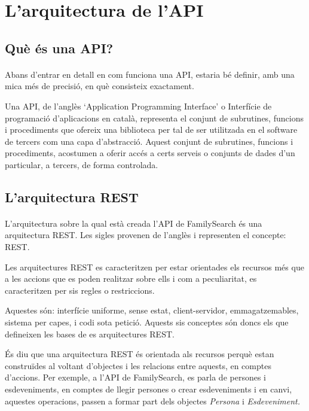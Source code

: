 \section{L'arquitectura de l'\gls{API}}


    \subsection{Què és una \gls{API}?}

    \paragraph{}
    Abans d'entrar en detall en com funciona una \gls{API}, estaria bé definir, amb una mica més de precisió, en què consisteix exactament.

    Una \gls{API}, de l'anglès `Application Programming Interface' o Interfície de programació d'aplicacions en català, representa el conjunt de subrutines, funcions i procediments que ofereix una biblioteca per tal de ser utilitzada en el software de tercers com una capa d'abstracció. Aquest conjunt de subrutines, funcions i procediments, acostumen a oferir accés a certs serveis o conjunts de dades d'un particular, a tercers, de forma controlada.


    \subsection{L'arquitectura REST}

    \paragraph{}
    L’arquitectura sobre la qual està creada l’\gls{API} de FamilySearch és una arquitectura REST. Les sigles provenen de l’anglès i representen el concepte: \gls{REST}.

    Les arquitectures \gls{REST} es caracteritzen per estar orientades els recursos més que a les accions que es poden realitzar sobre ells i com a peculiaritat, es caracteritzen per sis regles o restriccions.

    Aquestes són: interfície uniforme, sense estat, client-servidor, emmagatzemables, sistema per capes, i codi sota petició. Aquests sis conceptes són doncs els que defineixen les bases de es arquitectures \gls{REST}.

    És diu que una arquitectura \gls{REST} és orientada als recursos perquè estan construïdes al voltant d’objectes i les relacions entre aquests, en comptes d’accions. Per exemple, a l’\gls{API} de FamilySearch, es parla de persones i esdeveniments, en comptes de llegir persones o crear esdeveniments i en canvi, aquestes operacions, passen a formar part dels objectes \emph{Persona} i \emph{Esdeveniment.}

